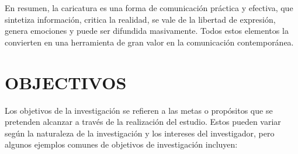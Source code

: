 \documentclass[12pt,a4paper]{article}
\begin{document}
En resumen, la caricatura es una forma de comunicación práctica y efectiva, que sintetiza información, critica la realidad, se vale de la libertad de expresión, genera emociones y puede ser difundida masivamente. Todos estos elementos la convierten en una herramienta de gran valor en la comunicación contemporánea.





\section{OBJECTIVOS}
Los objetivos de la investigación se refieren a las metas o propósitos que se pretenden alcanzar a través de la realización del estudio. Estos pueden variar según la naturaleza de la investigación y los intereses del investigador, pero algunos ejemplos comunes de objetivos de investigación incluyen:
\end{document}

